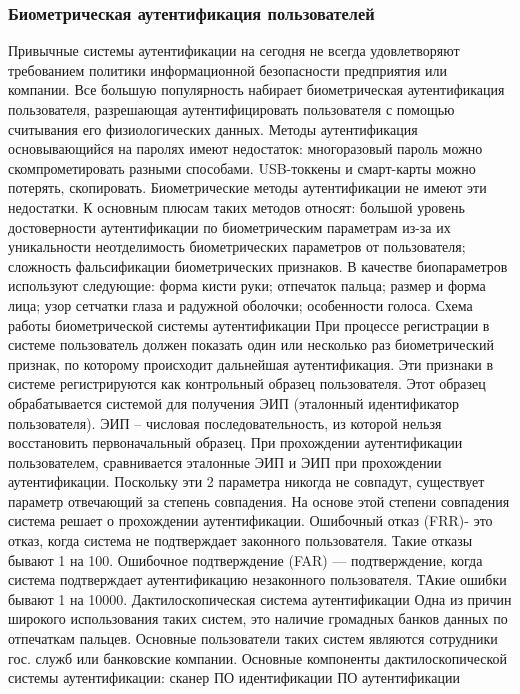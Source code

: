 \documentclass[a4paper,12pt]{extarticle}
\begin{document}
	\subsubsection{Биометрическая аутентификация пользователей}
	Привычные системы аутентификации на сегодня не всегда удовлетворяют требованием политики информационной безопасности предприятия или компании. Все большую популярность набирает биометрическая аутентификация пользователя, разрешающая аутентифицировать пользователя с помощью считывания его физиологических данных.
	Методы аутентификация основывающийся на паролях имеют недостаток: многоразовый пароль можно скомпрометировать разными способами. USB-токкены и смарт-карты можно потерять, скопировать. Биометрические методы аутентификации не имеют эти недостатки. К основным плюсам таких методов относят:
	 большой уровень достоверности аутентификации по биометрическим параметрам из-за их уникальности
	 неотделимость биометрических параметров от пользователя;
	 сложность фальсификации биометрических признаков.
	В качестве биопараметров используют следующие:
	 форма кисти руки;
	 отпечаток пальца;
	 размер и форма лица;
	 узор сетчатки глаза и радужной оболочки;
	 особенности голоса.
	Схема работы биометрической системы аутентификации
	При процессе регистрации в системе пользователь должен показать один или несколько раз биометрический признак, по которому происходит дальнейшая аутентификация. Эти признаки в системе регистрируются как контрольный образец пользователя. Этот образец обрабатывается системой для получения ЭИП (эталонный идентификатор пользователя). ЭИП – числовая последовательность, из которой нельзя восстановить первоначальный образец. При прохождении аутентификации пользователем, сравнивается эталонные ЭИП и ЭИП при прохождении аутентификации. Поскольку эти 2 параметра никогда не совпадут, существует параметр отвечающий за степень совпадения. На основе этой степени совпадения система решает о прохождении аутентификации.
	Ошибочный отказ (FRR)- это отказ, когда система не подтверждает законного пользователя. Такие отказы бывают 1 на 100.
	Ошибочное подтверждение (FAR) — подтверждение, когда система подтверждает аутентификацию незаконного пользователя. ТАкие ошибки бывают 1 на 10000.
	Дактилоскопическая система аутентификации
	Одна из причин широкого использования таких систем, это наличие громадных банков данных по отпечаткам пальцев. Основные пользователи таких систем являются сотрудники гос. служб или банковские компании. Основные компоненты дактилоскопической системы аутентификации:
	 сканер
	 ПО идентификации
	 ПО аутентификации
	
\end{document}

